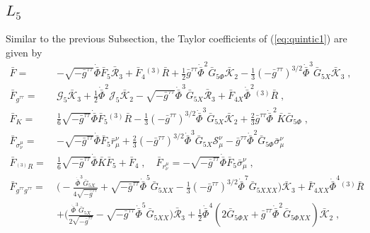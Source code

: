 \documentclass[a4paper,11pt]{article}
\numberwithin{equation}{section}
\begin{document}
\subsection{$L_5$}
 Similar to the previous Subsection, the Taylor coefficients of (\ref{eq:quintic1}) are given by 
 \begin{align}
 \bar{F} = \ &-\sqrt{-\bar{g}^{\tau\tau}} \dot{\bar{\Phi}} \bar{F}_5 \mathcal{\bar{R}}_3 + \bar{F}_4 {}^{(3)}\!\bar{R} + \frac{1}{2} \bar{g}^{\tau\tau} \dot{\bar{\Phi}}^2 \bar{G}_{5\Phi} \mathcal{\bar{K}}_2  - \frac{1}{3} (-\bar{g}^{\tau\tau})^{3/2} \dot{\bar{\Phi}}^3 \bar{G}_{5X} \mathcal{\bar{K}}_3 \;, \nonumber \\
 \bar{F}_{g^{\tau\tau}} = \ & \mathcal{G}_5\mathcal{\bar{K}}_3 + \frac{1}{2}\dot{\bar{\Phi}}^2 \mathcal{J}_5 \mathcal{\bar{K}}_2 - \sqrt{-\bar{g}^{\tau\tau}}\dot{\bar{\Phi}}^3 \bar{G}_{5X} \mathcal{\bar{R}}_3 + \bar{F}_{4X} \dot{\bar{\Phi}}^2 {}^{(3)}\!\bar{R} \;, \nonumber \\
 \bar{F}_{K} = \ &\frac{1}{6} \sqrt{-\bar{g}^{\tau\tau}}\dot{\bar{\Phi}} \bar{F}_5 {}^{(3)}\!\bar{R} - \frac{1}{3} (-\bar{g}^{\tau\tau})^{3/2} \dot{\bar{\Phi}}^3 \bar{G}_{5X} \mathcal{\bar{K}}_2 + \frac{2}{3} \bar{g}^{\tau\tau} \dot{\bar{\Phi}}^2 \bar{K} \bar{G}_{5\Phi}  \;, \nonumber \\ 
  \bar{F}_{\sigma^\mu_\nu} = \ & - \sqrt{-\bar{g}^{\tau\tau}} \dot{\bar{\Phi}} \bar{F}_5 \bar{r}^\nu_\mu + \frac{2}{3} (-\bar{g}^{\tau\tau})^{3/2} \dot{\bar{\Phi}}^3 \bar{G}_{5X} \mathcal{S}^\nu_\mu - \bar{g}^{\tau\tau} \dot{\bar{\Phi}}^2 \bar{G}_{5\Phi}\bar{\sigma}^\nu_\mu \nonumber \\ 
  \bar{F}_{{}^{(3)}\!R} = \ & \frac{1}{6} \sqrt{-\bar{g}^{\tau\tau}} \dot{\bar{\Phi}} \bar{K} \bar{F}_5 + \bar{F}_4 \;, \quad \bar{F}_{r^\mu_\nu} = - \sqrt{-\bar{g}^{\tau\tau}} \dot{\bar{\Phi}} \bar{F}_5 \bar{\sigma}_\mu^\nu \;, \nonumber \\
 \bar{F}_{g^{\tau\tau} g^{\tau\tau}} = \ & \bigg(-\frac{\dot{\bar{\Phi}}^3 \bar{G}_{5X}}{4\sqrt{-\bar{g}^{\tau\tau}}}  + \sqrt{-\bar{g}^{\tau\tau}} \dot{\bar{\Phi}}^5 \bar{G}_{5XX} - \frac{1}{3}(-\bar{g}^{\tau\tau})^{3/2} \dot{\bar{\Phi}}^7 \bar{G}_{5XXX} \bigg) \mathcal{\bar{K}}_3 + \bar{F}_{4XX}\dot{\bar{\Phi}}^4 {}^{(3)}\!\bar{R}  \\ 
 &+ \bigg(\frac{\dot{\bar{\Phi}}^3 \bar{G}_{5X}}{2 \sqrt{-\bar{g}^{\tau\tau}}}  - \sqrt{-\bar{g}^{\tau\tau}} \dot{\bar{\Phi}}^5 \bar{G}_{5 XX} \bigg)\mathcal{\bar{R}}_3 + \frac{1}{2}\dot{\bar{\Phi}}^4  (2 \bar{G}_{5\Phi X} + \bar{g}^{\tau\tau} \dot{\bar{\Phi}}^2 \bar{G}_{5\Phi XX}) \mathcal{\bar{K}}_2 \;, \nonumber \\

\end{align}
\end{document}
